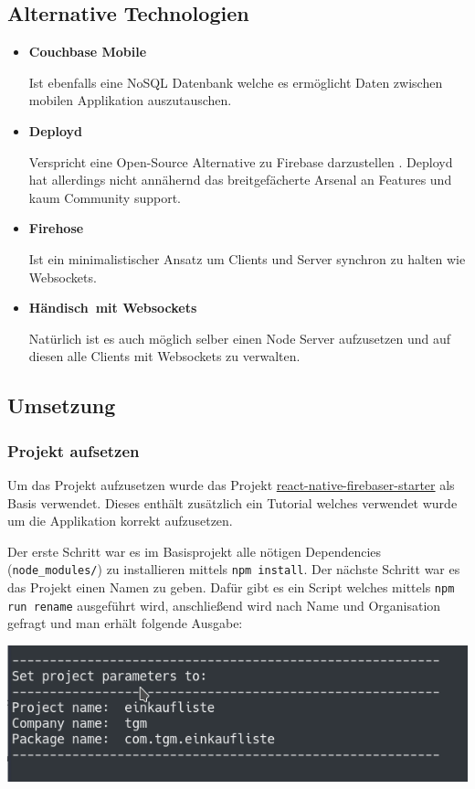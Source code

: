 \subsection{Alternative Technologien}

\begin{itemize}
	\item \textbf{Couchbase Mobile}
	
	Ist ebenfalls eine NoSQL Datenbank welche es ermöglicht Daten zwischen mobilen Applikation auszutauschen. \cite{Couchbas67:online}
	\item \textbf{Deployd}
	
	Verspricht eine Open-Source Alternative zu Firebase darzustellen \cite{deployd58:online}. Deployd hat allerdings nicht annähernd das breitgefächerte Arsenal an Features und kaum Community support. 
	\item \textbf{Firehose}
	
	Ist ein minimalistischer Ansatz um Clients und Server synchron zu halten wie Websockets. \cite{Firehose82:online}
	\item \textbf{\glqq Händisch\grqq\ mit Websockets}
	
	Natürlich ist es auch möglich selber einen Node Server aufzusetzen und auf diesen alle Clients mit Websockets zu verwalten. 
\end{itemize}

\subsection{Umsetzung}
\subsubsection{Projekt aufsetzen}
Um das Projekt aufzusetzen wurde das Projekt \href{https://github.com/invertase/react-native-firebase-starter}{react-native-firebaser-starter} als Basis verwendet. Dieses enthält zusätzlich ein Tutorial \cite{invertas82:online} welches verwendet wurde um die Applikation korrekt aufzusetzen.

Der erste Schritt war es im Basisprojekt alle nötigen Dependencies (\verb|node_modules/|) zu installieren mittels \verb|npm install|. Der nächste Schritt war es das Projekt einen Namen zu geben. Dafür gibt es ein Script welches mittels \verb|npm run rename| ausgeführt wird, anschließend wird nach Name und Organisation gefragt und man erhält folgende Ausgabe:

\begin{minipage}{\linewidth}
	\centering
	\includegraphics[width=0.8\linewidth]{images/1}
\end{minipage}
